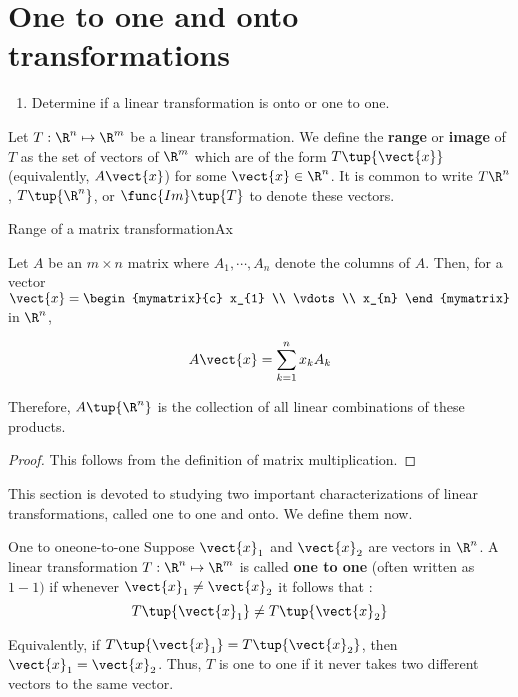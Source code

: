 \section{One to one and onto transformations}

\begin{outcome}
  \begin{enumerate}
  \item Determine if a linear transformation is onto or one to one.
  \end{enumerate}
\end{outcome}

Let $T: \R^n \mapsto \R^m$ be a linear transformation. We define the \textbf{range} or \textbf{image} of $T$ as the set of vectors of $\R^{m}$ which are of the form
$T \tup{\vect{x}}$ (equivalently, $A\vect{x}$) for some $\vect{x}\in \R^{n}$. It is common
to write $T\R^{n}$, $T\tup{\R^{n}}$, or
$\func{Im}\tup{T} $ to denote these vectors.  

\begin{lemma}{Range of a matrix transformation}{Ax}

Let $A$ be an $m\times n$ matrix where $A_{1},\cdots , A_{n}$ denote the columns of
$A$. Then, for a vector $\vect{x}=\begin{mymatrix}{c}
x_{1} \\
\vdots \\
 x_{n}
\end{mymatrix}$ in $\R^n$,

\begin{equation*}
A\vect{x}=\sum_{k=1}^{n}x_{k}A_{k}
\end{equation*}

Therefore, $A \tup{\R^n }$ is the collection of all
linear combinations of these products.
\end{lemma}

\begin{proof}
This follows from the definition of matrix multiplication.
\end{proof}

This section is devoted to studying two important characterizations of linear transformations, called one to one and onto. We define them now. 

\begin{definition}{One to one}{one-to-one}
Suppose $\vect{x}_1$ and $\vect{x}_2$ are vectors in $\R^n$. A linear transformation $T: \R^n \mapsto \R^m$ is called \textbf{one to one} (often written as $1-1)$ if whenever
 $\vect{x}_1 \neq \vect{x}_2$ it follows that :
\begin{equation*}
T\tup{\vect{x}_1 } \neq T \tup{\vect{x}_2}
\end{equation*}

Equivalently, if $T\tup{\vect{x}_1 } =T\tup{\vect{x}_2}$,
then $\vect{x}_1 = \vect{x}_2$. Thus,  $T$ is one to one if it never takes two different
vectors to the same vector.
\end{definition}

